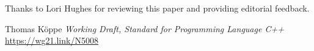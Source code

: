 \documentclass{wg21}
\begin{document}
Thanks to Lori Hughes for reviewing this paper and providing editorial feedback.




\renewcommand{\section}[2]{}%

\begin{thebibliography}{9}


Thomas Köppe
\emph{Working Draft, Standard for Programming Language C++}\newline
\url{https://wg21.link/N5008}


\end{thebibliography}
\end{document}
